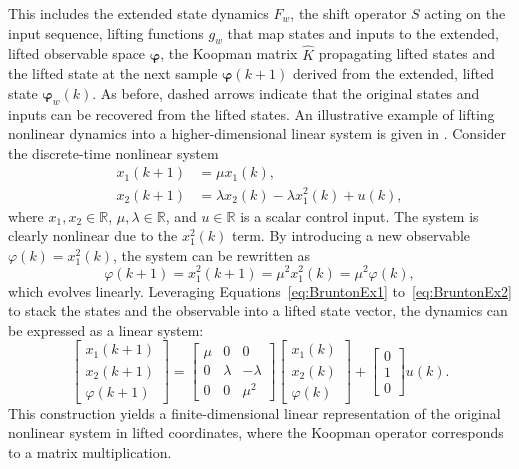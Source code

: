This includes the extended state dynamics \(F_w\), the shift operator \(S\) acting on the input sequence, lifting functions \(g_w\) that map states and inputs to the extended, lifted observable space $\bm{\varphi}$, the Koopman matrix \(\hat{K}\) propagating lifted states and the lifted state at the next sample  $\bm{\varphi}(k+1)$ derived from the extended, lifted state $\bm{\varphi}_w(k)$. As before, dashed arrows indicate that the original states and inputs can be recovered from the lifted states.
%
An illustrative example of lifting nonlinear dynamics into a higher-dimensional linear system is given in \cite{brunton2016koopman}. Consider the discrete-time nonlinear system
\begin{align} \label{eq:BruntonEx1}
    x_1(k+1) &= \mu x_1(k), \\
    x_2(k+1) &= \lambda x_2(k) - \lambda x_1^2(k) + u(k),
\end{align}
where \( x_1, x_2 \in \mathbb{R} \), \( \mu, \lambda \in \mathbb{R} \), and \( u \in \mathbb{R} \) is a scalar control input. The system is clearly nonlinear due to the \( x_1^2(k) \) term. By introducing a new observable \( \varphi(k) = x_1^2(k) \), the system can be rewritten as 
\begin{equation} \label{eq:BruntonEx2}
    \varphi(k+1) = x_1^2(k+1) = \mu^2 x_1^2(k) = \mu^2 \varphi(k),
\end{equation}
which evolves linearly. Leveraging Equations~\eqref{eq:BruntonEx1} to~\eqref{eq:BruntonEx2} to stack the states and the observable into a lifted state vector, the dynamics can be expressed as a linear system:
\begin{equation}
    \begin{bmatrix}
        x_1(k+1) \\
        x_2(k+1) \\
        \varphi(k+1)
    \end{bmatrix}
    =
    \begin{bmatrix}
        \mu & 0 & 0 \\
        0 & \lambda & -\lambda \\
        0 & 0 & \mu^2
    \end{bmatrix}
    \begin{bmatrix}
        x_1(k) \\
        x_2(k) \\
        \varphi(k)
    \end{bmatrix}
    +
    \begin{bmatrix}
        0 \\
        1 \\
        0
    \end{bmatrix}
    u(k).
\end{equation}
This construction yields a finite-dimensional linear representation of the original nonlinear system in lifted coordinates, where the Koopman operator corresponds to a matrix multiplication.

